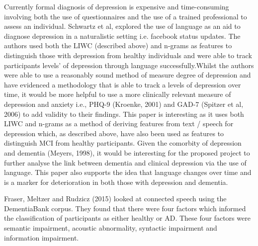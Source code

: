 \documentclass[a4paper]{article}
\begin{document}
\par
Currently formal diagnosis of depression is expensive and time-consuming involving both the use of questionnaires and the use of a trained professional to assess an individual. Schwartz et al, explored the use of language as an aid to diagnose depression in a naturalistic setting i.e. facebook status updates. The authors used both the LIWC (described above) and n-grams as features to distinguish those with depression from healthy individuals and were able to track participants levels' of depression through language successfully.Whilst the authors were able to use a reasonably sound method of measure degree of depression and have evidenced a methodology that is able to track a levels of depression over time, it would be more helpful to use a more clinically relevant measure of depression and anxiety i.e., PHQ-9 (Kroenke, 2001) and GAD-7 (Spitzer et al, 2006) to add validity to their findings. This paper is interesting as it uses both LIWC and n-grams as a method of deriving features from text / speech for depression which, as described above, have also been used as features to distinguish MCI from healthy participants. Given the comorbity of depression and dementia (Meyers, 1998), it would be interesting for the proposed project to further analyse the link between dementia and clinical depression via the use of language. This paper also supports the idea that language changes over time and is a marker for deterioration in both those with depression and dementia. \newline
\par
Fraser, Meltzer and Rudzicz (2015) looked at connected speech using the DementiaBank corpus. They found that there were four factors which informed the classification of participants as either healthy or AD. These four factors were semantic impairment, acoustic abnormality, syntactic impairment and information impairment.\newline
\par
\end{document}

